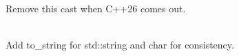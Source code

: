 \begin{DoxyRefList}
\label{todo__todo000007}%
%
Remove this cast when C++26 comes out.  
\item[Member \doxylink{namespaceauspicious__library_1_1sm_a557e590ecf315060dbbe49015d5e90fb}{auspicious\+\_\+library\+::sm\+::word\+\_\+wrap} (std\+::string\+\_\+view string, std\+::size\+\_\+t width, bool force=false, std\+::string\+\_\+view delims="{} \textbackslash{}\textbackslash{}t\textbackslash{}\textbackslash{}r\textbackslash{}\textbackslash{}n\textbackslash{}\textbackslash{}f\textbackslash{}\textbackslash{}v\textbackslash{}\textbackslash{}b"{})]\hfill \\
\label{todo__todo000008}%
%
Add to\+\_\+string for std\+::string and char for consistency. 
\end{DoxyRefList}